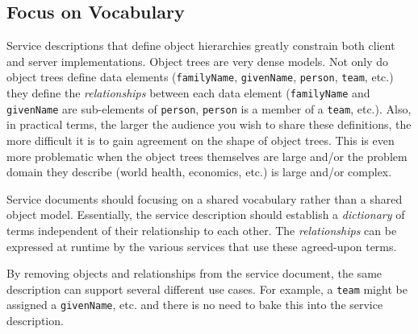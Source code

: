 \documentclass{wsrest2014}
\begin{document}
\subsection{Focus on Vocabulary}
\label{_focus_on_vocabulary}
 \par{}Service descriptions that define object hierarchies greatly constrain both client and server implementations. Object trees are very dense models. Not only do object trees define data elements (\texttt{familyName}, \texttt{givenName}, \texttt{person}, \texttt{team}, etc.) they define the \emph{relationships} between each data element (\texttt{familyName} and \texttt{givenName} are sub-elements of \texttt{person}, \texttt{person} is a member of a \texttt{team}, etc.). Also, in practical terms, the larger the audience you wish to share these definitions, the more difficult it is to gain agreement on the shape of object trees. This is even more problematic when the object trees themselves are large and/or the problem domain they describe (world health, economics, etc.) is large and/or complex.
 \par{}Service documents should focusing on a shared vocabulary rather than a shared object model. Essentially, the service description should establish a \emph{dictionary} of terms independent of their relationship to each other. The \emph{relationships} can be expressed at runtime by the various services that use these agreed-upon terms.
 \par{}By removing objects and relationships from the service document, the same description can support several different use cases. For example, a \texttt{team} might be assigned a \texttt{givenName}, etc. and there is no need to bake this into the service description.
\hypertarget{_protocol_agnostic}{}
\end{document}
